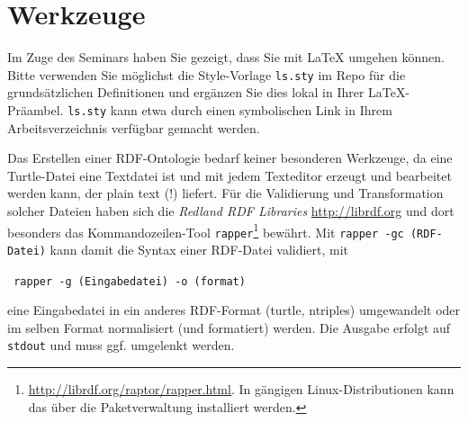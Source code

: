 \documentclass[11pt,a4paper]{article}
\begin{document}
\section{Werkzeuge}

Im Zuge des Seminars haben Sie gezeigt, dass Sie mit {\LaTeX} umgehen können.
Bitte verwenden Sie möglichst die Style-Vorlage \texttt{ls.sty} im Repo für
die grundsätzlichen Definitionen und ergänzen Sie dies lokal in Ihrer
\LaTeX-Präambel.  \texttt{ls.sty} kann etwa durch einen symbolischen Link in
Ihrem Arbeitsverzeichnis verfügbar gemacht werden.

Das Erstellen einer RDF-Ontologie bedarf keiner besonderen Werkzeuge, da eine
Turtle-Datei eine Textdatei ist und mit jedem Texteditor erzeugt und
bearbeitet werden kann, der plain text (!) liefert.  Für die Validierung und
Transformation solcher Dateien haben sich die \emph{Redland RDF Libraries}
\url{http://librdf.org} und dort besonders das Kommandozeilen-Tool
\texttt{rapper}\footnote{\url{http://librdf.org/raptor/rapper.html}.  In
  gängigen Linux-Distributionen kann das über die Paketverwaltung installiert
  werden. } bewährt.
Mit \texttt{rapper -gc (RDF-Datei)} kann damit die Syntax einer RDF-Datei
validiert, mit 
\begin{center}\tt
  rapper -g (Eingabedatei) -o (format)
\end{center}
eine Eingabedatei in ein anderes RDF-Format (turtle, ntriples) umgewandelt
oder im selben Format normalisiert (und formatiert) werden.  Die Ausgabe
erfolgt auf \texttt{stdout} und muss ggf. umgelenkt werden.
\end{document}
